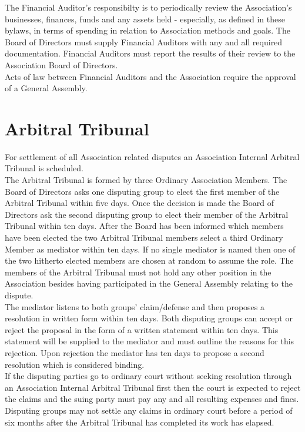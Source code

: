 The Financial Auditor's responsibilty is to periodically review the Association’s businesses, finances, funds and any assets held - especially, as defined in these bylaws, in terms of spending in relation to Association methods and goals. The Board of Directors must supply Financial Auditors with any and all required documentation. Financial Auditors must report the results of their review to the Association Board of Directors.\\

Acts of law between Financial Auditors and the Association require the approval of a General Assembly.\\




\section{Arbitral Tribunal}

For settlement of all Association related disputes an Association Internal Arbitral Tribunal is scheduled.\\     

The Arbitral Tribunal is formed by three Ordinary Association Members. The Board of Directors asks one disputing group to elect the first member of the Arbitral Tribunal within five days. Once the decision is made the Board of Directors ask the second disputing group to elect their member of the Arbitral Tribunal within ten days. After the Board has been informed which members have been elected the two Arbitral Tribunal members select a third Ordinary Member as mediator within ten days. If no single mediator is named then one of the two hitherto elected members are chosen at random to assume the role. The members of the Arbitral Tribunal must not hold any other position in the Association besides having participated in the General Assembly relating to the dispute.\\

The mediator listens to both groups’ claim/defense and then proposes a resolution in written form within ten days. Both disputing groups can accept or reject the proposal in the form of a written statement within ten days. This statement will be supplied to the mediator and must outline the reasons for this rejection. Upon rejection the mediator has ten days to propose a second resolution which is considered binding.\\

If the disputing parties go to ordinary court without seeking resolution through an Association Internal Arbitral Tribunal first then the court is expected to reject the claims and the suing party must pay any and all resulting expenses and fines. Disputing groups may not settle any claims in ordinary court before a period of six months after the Arbitral Tribunal has completed its work has elapsed.\\





